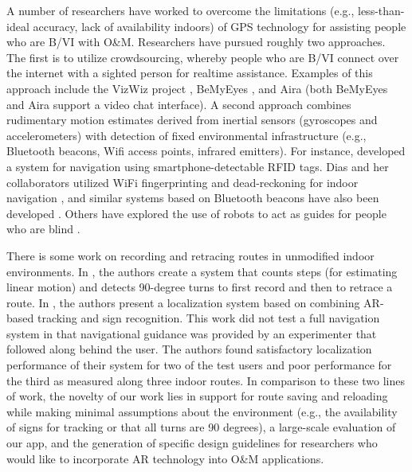 \documentclass[chi_draft]{sigchi}
\newcommand{\BVI}{B/VI\xspace}
\newcommand{\OM}{O\&M\xspace}
\begin{document}
A number of researchers have worked to overcome the limitations (e.g., less-than-ideal accuracy, lack of availability indoors) of GPS technology for assisting people who are \BVI with \OM.  Researchers have pursued roughly two approaches.  The first is to utilize crowdsourcing, whereby people who are \BVI connect over the internet with a sighted person for realtime assistance.  Examples of this approach include the VizWiz project \cite{bigham2010vizwiz}, BeMyEyes \cite{bemyeyesaccessworld}, and Aira \cite{aira} (both BeMyEyes and Aira support a video chat interface).  A second approach combines rudimentary motion estimates derived from inertial sensors (gyroscopes and accelerometers) with detection of fixed environmental infrastructure (e.g., Bluetooth beacons, Wifi access points, infrared emitters).  For instance, \cite{ganz2015percept, ganz2011percept, ganz2014percept} developed a system for navigation using smartphone-detectable RFID tags.  Dias and her collaborators utilized WiFi fingerprinting and dead-reckoning for indoor navigation \cite{Dias__2014_7778}, and similar systems based on Bluetooth beacons have also been developed \cite{ishihara2017beacon, ahmetovic2016navcog}.  Others have explored the use of robots to act as guides for people who are blind \cite{Nanavati:2018:CIN:3173386.3176976}.%

There is some work on recording and retracing routes in unmodified indoor environments.  In \cite{flores2018easy, flores2014ariadne}, the authors create a system that counts steps (for estimating linear motion) and detects 90-degree turns to first record and then to retrace a route.  In \cite{fusco2018indoor}, the authors present a localization system based on combining AR-based tracking and sign recognition.  This work did not test a full navigation system in that navigational guidance was provided by an experimenter that followed along behind the user.  The authors found satisfactory localization performance of their system for two of the test users and poor performance for the third as measured along three indoor routes.  In comparison to these two lines of work, the novelty of our work lies in support for route saving and reloading while making minimal assumptions about the environment (e.g., the availability of signs for tracking or that all turns are 90 degrees), a large-scale evaluation of our app, and the generation of specific design guidelines for researchers who would like to incorporate AR technology into \OM applications.
\end{document}
